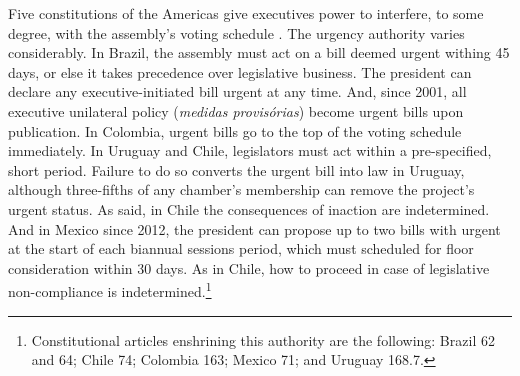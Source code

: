 \documentclass[letter,12pt]{article}
\newcommand{\emm}[1]{\todo[color=blue!30, inline]{\textbf{To do:} #1}}
\begin{document}
Five constitutions of the Americas give executives power to interfere, to some degree, with the assembly's voting schedule \citep{morgenstern.2002b}. The urgency authority varies considerably. In Brazil, the assembly must act on a bill deemed urgent withing 45 days, or else it takes precedence over legislative business. The president can declare any executive-initiated bill urgent at any time. And, since 2001, all executive unilateral policy (\emph{medidas provis\'orias}) become urgent bills upon publication. In Colombia, urgent bills go to the top of the voting schedule immediately. In Uruguay and Chile, legislators must act within a pre-specified, short period. Failure to do so converts the urgent bill into law in Uruguay, although three-fifths of any chamber's membership can remove the project's urgent status. As said, in Chile the consequences of inaction are indetermined. And in Mexico since 2012, the president can propose up to two bills with urgent at the start of each biannual sessions period, which must scheduled for floor consideration within 30 days. As in Chile, how to proceed in case of legislative non-compliance is indetermined.\footnote{Constitutional articles enshrining this authority are the following: Brazil 62 and 64; Chile 74; Colombia 163; Mexico 71; and Uruguay 168.7.}

\end{document}
